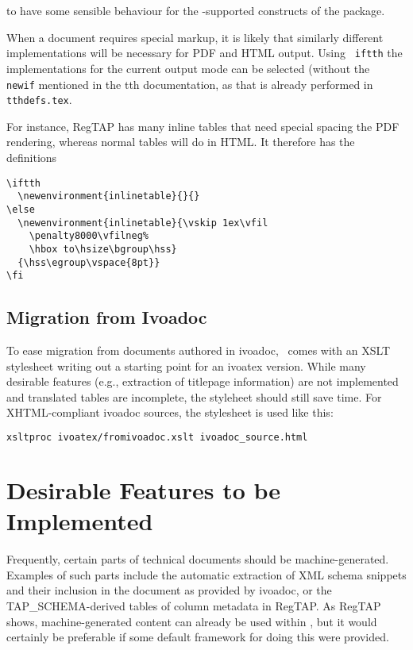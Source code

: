 \documentclass[11pt,a4paper]{ivoa}
\newcommand{\texword}[1]{\texttt{\color{texcolor} #1}}
\begin{document}
to have some sensible behaviour for the \ivoatex-supported constructs of
the package.

When a document requires special markup, it is likely that similarly
different implementations will be necessary for PDF and HTML output.
Using \texword{iftth} the implementations for the current output mode
can be selected (without the \texword{newif} mentioned in the tth
documentation, as that is already performed in \texttt{tthdefs.tex}.

For instance, RegTAP has many inline tables that need special spacing
the PDF rendering, whereas normal tables will do in HTML.  It therefore
has the definitions

\begin{lstlisting}
\iftth
  \newenvironment{inlinetable}{}{}
\else
  \newenvironment{inlinetable}{\vskip 1ex\vfil
    \penalty8000\vfilneg%
    \hbox to\hsize\bgroup\hss}
  {\hss\egroup\vspace{8pt}}
\fi
\end{lstlisting}


\subsection{Migration from Ivoadoc}

To ease migration from documents authored in ivoadoc, \ivoatex\ comes
with an XSLT stylesheet writing out a starting point for an ivoatex
version.  While many desirable features (e.g., extraction of titlepage
information) are not implemented and translated tables are incomplete,
the styleheet should still save time.  For XHTML-compliant ivoadoc
sources, the stylesheet is used like this:

\begin{lstlisting}[language=sh]
xsltproc ivoatex/fromivoadoc.xslt ivoadoc_source.html
\end{lstlisting}


\section{Desirable Features to be Implemented}

Frequently, certain parts of technical documents should be
machine-ge\-ne\-ra\-ted.  Examples of such parts include the automatic
extraction of XML schema snippets and their inclusion in the document
as provided by ivoadoc, or the TAP\_SCHEMA-derived tables of column
metadata in RegTAP.  As RegTAP shows, machine-generated content can
already be used within \ivoatex, but it would certainly be preferable if
some default framework for doing this were provided.
\end{document}
